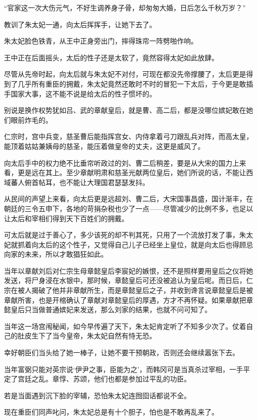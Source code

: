 “官家这一次大伤元气，不好生调养身子骨，却匆匆大婚，日后怎么千秋万岁？”

教训了朱太妃一通，向太后挥挥手，让她下去了。

朱太妃脸色铁青，从王中正身旁出门，摔得珠帘一阵劈啪作响。

王中正在后面摇头，太后的性子还是太软了，竟然容得太妃如此放肆。

尽管从先帝时起，向太后就与朱太妃不对付，可现在都没先帝撑腰了，太后更是得到了几乎所有重臣的拥戴，朱太妃竟然还敢时不时的冒犯一下太后，于今更是敢插手国家大事，这不能不说是给太后的性子惯坏的。

别说是换作权势犹如吕、武的章献皇后，就是曹、高二后，都是没哪位嫔妃敢在她们眼前炸毛的。

仁宗时，宫中兵变，慈圣曹后能指挥宫女、内侍拿着弓刀跟乱兵对阵，而高太皇，能顶着姑姑兼姨母的慈圣，能压着做皇帝的丈夫，这更是威风了。

向太后手中的权力绝不比垂帘听政过的刘、曹二后稍差，要是从大宋的国力上来看，更是远在其上。至少章献明肃和慈圣光献两位皇后，她们所说的话，不能让西域蕃人俯首帖耳，也不能让大理国君瑟瑟发抖。

从民间的声望上来看，向太后更是远超刘、曹二后，大宋国事昌盛，国计渐丰，在朝廷的三令五申下，各地的苛捐杂税也少了一点——尽管减少的比例不多，也足以让太后和宰相们得到天下百姓们的拥戴。

可太后就是过于善心了，多少该死的却不判其死，只用了一个流放打发了事，朱太妃就抓着向太后的这个性子，又觉得自己儿子已经坐上皇位，就是向太后也得顾忌向家的未来，所以才敢猖狂如此。

当年以章献刘后对仁宗生母章懿皇后李宸妃的嫉恨，还不是照样要用皇后之仪将她发送，将尸身浸在水银中，那时候，章懿皇后可还没被追认为皇后呢。而日后，仁宗在被人揭破了他并非章献所生，而是章懿皇后之子，并收到谗言说章懿皇后是被章献所害，也是开棺确认了章献对章懿皇后的厚遇，方才不再怀疑。如果章献把章懿皇后只当做普通嫔妃来发送，那么刘家的结果，也就不问可知了。

当年这一场宫闱秘闻，如今早传遍了天下，朱太妃肯定听了不知多少次了。仗着自己的肚皮生下了当今皇帝，朱太妃自然有恃无恐。

幸好朝臣们当头给了她一棒子，让她不要干预朝政，否则还会继续嚣张下去。

当年富弼只能对英宗说‘伊尹之事，臣能为之’，而韩冈可是当真杀过宰相，一手平定了宫廷之乱。章惇、苏颂，他们也都是参加过平乱的功臣。

若是当面遇到沉下脸的宰辅，恐怕朱太妃连囫囵话都说不全。

现在重臣们同声叱问，朱太妃总是有十个胆子，怕也是不敢再乱来了。

